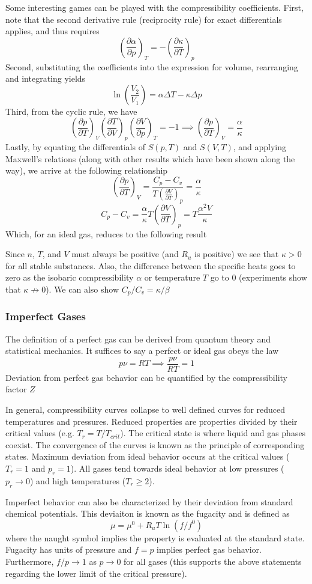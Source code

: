 \documentclass[11pt]{article}
\newcommand{\CenteredBoxed}[1]{\begin{center}\boxed{#1}\end{center}}
\newcommand{\Partial}[2]{\frac{\partial #1}{\partial #2}}
\newcommand{\PartialConst}[3]{\left(\Partial{#1}{#2}\right)_{#3}}
\begin{document}
Some interesting games can be played with the compressibility coefficients. First, note that the second derivative rule (reciprocity rule) for exact differentials applies, and thus requires
$$\PartialConst{\alpha}{p}{T} = -\PartialConst{\kappa}{T}{p}$$
Second, substituting the coefficients into the expression for volume, rearranging and integrating yields
$$\ln\left(\frac{V_2}{V_1}\right) = \alpha\Delta T - \kappa\Delta p$$
Third, from the cyclic rule, we have
$$\PartialConst{p}{T}{V}\PartialConst{T}{V}{p}\PartialConst{V}{p}{T}=-1\implies\PartialConst{p}{T}{V}=\frac{\alpha}{\kappa}$$
Lastly, by equating the differentials of $S(p,T)$ and $S(V,T)$, and applying Maxwell's relations (along with other results which have been shown along the way), we arrive at the following relationship
$$\PartialConst{p}{T}{V} = \frac{C_p-C_v}{T\PartialConst{V}{T}{p}} = \frac{\alpha}{\kappa}$$
$$C_p - C_v  = \frac{\alpha}{\kappa}T\PartialConst{V}{T}{p}=T\frac{\alpha^2V}{\kappa}$$
Which, for an ideal gas, reduces to the following result
\CenteredBoxed{C_p - C_v = \frac{pV}{T} = nR_u}
Since $n$, $T$, and $V$ must always be positive (and $R_u$ is positive) we see that $\kappa>0$ for all stable substances. Also, the difference between the specific heats goes to zero as the isobaric compressibility $\alpha$ or temperature $T$ go to 0 (experiments show that $\kappa\not\to0$). We can also show $C_p/C_v=\kappa/\beta$

\subsubsection{Imperfect Gases}
The definition of a perfect gas can be derived from quantum theory and statistical mechanics. It suffices to say a perfect or ideal gas obeys the law
$$p\nu=RT\implies \frac{p\nu}{RT}=1$$
Deviation from perfect gas behavior can be quantified by the compressibility factor $Z$
\CenteredBoxed{Z=\frac{p\nu}{RT}}

In general, compressibility curves collapse to well defined curves for reduced temperatures and pressures. Reduced properties are properties divided by their critical values (e.g. $T_r = T/T_{crit}$). The critical state is where liquid and gas phases coexist. The convergence of the curves is known as the principle of corresponding states. Maximum deviation from ideal behavior occurs at the critical values ($T_r=1$ and $p_r=1$). All gases tend towards ideal behavior at low pressures ($p_r\to0$) and high temperatures ($T_r\geq2$).

Imperfect behavior can also be characterized by their deviation from standard chemical potentials. This deviaiton is known as the fugacity and is defined as
$$\mu=\mu^0+R_uT\ln(f/f^0)$$
where the naught symbol implies the property is evaluated at the standard state. Fugacity has units of pressure and $f=p$ implies perfect gas behavior. Furthermore, $f/p\to1$ as $p\to0$ for all gases (this supports the above statements regarding the lower limit of the critical pressure).
\end{document}
